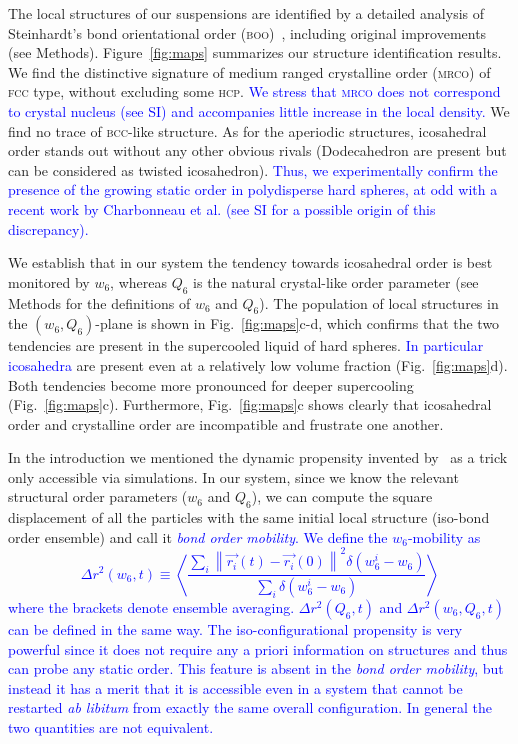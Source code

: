 The local structures of our suspensions are identified by a detailed analysis of Steinhardt's bond orientational order (\textsc{boo})~\citep{steinhardt1983boo}, including original improvements (see Methods). Figure~\ref{fig:maps} summarizes our structure identification results. We find the distinctive signature of medium ranged crystalline order (\textsc{mrco}) of \textsc{fcc} type, without excluding some \textsc{hcp}. \textcolor{blue}{We stress that \textsc{mrco} does not correspond to crystal nucleus (see SI) and accompanies little increase in the local density.} We find no trace of \textsc{bcc}-like structure. As for the aperiodic structures, icosahedral order stands out without any other obvious rivals (Dodecahedron are present but can be considered as twisted icosahedron). \textcolor{blue}{Thus, we experimentally confirm the presence of the growing static order in polydisperse hard spheres, at odd with a recent work by Charbonneau et al. \cite{Charbonneau} 
(see SI for a possible origin of this discrepancy).} 



We establish that in our system the tendency towards icosahedral order is best monitored by $w_6$, whereas $Q_6$ is the natural crystal-like order parameter (see Methods for the definitions of $w_6$ and $Q_6$). The population of local structures in the $(w_6,Q_6)$-plane is shown in Fig.~\ref{fig:maps}c-d, which confirms that the two tendencies are present in the supercooled liquid of hard spheres. \textcolor{blue}{In particular icosahedra} are present even at a relatively low volume fraction (Fig.~\ref{fig:maps}d). Both tendencies become more pronounced for deeper supercooling (Fig.~\ref{fig:maps}c). Furthermore, Fig.~\ref{fig:maps}c shows clearly that icosahedral order and crystalline order are incompatible and frustrate one another.



In the introduction we mentioned the dynamic propensity invented by~\citet{Widmer-Cooper2005} as a trick only accessible via simulations. In our system, since we know the relevant structural order parameters ($w_6$ and $Q_6$), we can compute the square displacement of all the particles with the same initial local structure (iso-bond order ensemble) and call it \textcolor{blue}{\emph{bond order mobility}. We define the $w_6$-mobility as
\begin{equation}
	\Delta r^2(w_6, t) \equiv \left\langle \frac{
		\sum\limits_i{
			\left\|\vec{r_i}(t)-\vec{r_i}(0)\right\|^2 \delta(w_6^i-w_6)
			}
	}{
		\sum\limits_i{\delta(w_6^i-w_6)}
	}\right\rangle 
	\label{eq:bo_propensity}
\end{equation}
where the brackets denote ensemble averaging. $\Delta r^2(Q_6, t)$ and $\Delta r^2(w_6, Q_6, t)$ can be defined in the same way. 
The iso-configurational propensity is very powerful since it does not require any a priori information on structures and thus can probe any static order. This feature is absent in the \emph{bond order mobility}, but instead it has a merit that it is accessible even in a system that cannot be restarted \emph{ab libitum} from exactly the same overall configuration. In general the two quantities are not equivalent.}

